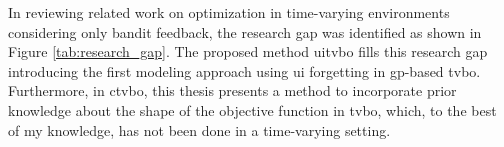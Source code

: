 In reviewing related work on optimization in time-varying environments considering only bandit feedback, the research gap was identified as shown in Figure \ref{tab:research_gap}. The proposed method \gls{uitvbo} fills this research gap introducing the first modeling approach using \gls{ui} forgetting in \gls{gp}-based \gls{tvbo}.
Furthermore, in \gls{ctvbo}, this thesis presents a method to incorporate prior knowledge about the shape of the objective function in \gls{tvbo}, which, to the best of my knowledge, has not been done in a time-varying setting.

